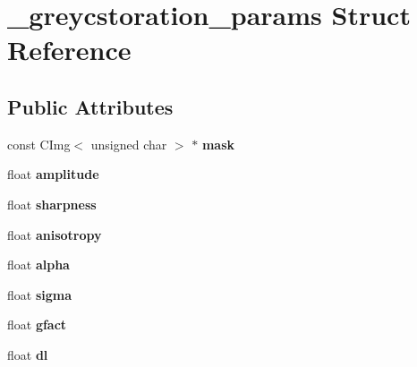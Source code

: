 \hypertarget{struct__greycstoration__params}{\section{\-\_\-greycstoration\-\_\-params Struct Reference}
\label{struct__greycstoration__params}
}
\subsection*{Public Attributes}
\begin{DoxyCompactItemize}
\item 
\hypertarget{struct__greycstoration__params_a877f6302eb82945daf2cf7279a3fe259}{const C\-Img$<$ unsigned char $>$ $\ast$ {\bfseries mask}}\label{struct__greycstoration__params_a877f6302eb82945daf2cf7279a3fe259}

\item 
\hypertarget{struct__greycstoration__params_a55ed63c4963f130a93a5997c6fc15644}{float {\bfseries amplitude}}\label{struct__greycstoration__params_a55ed63c4963f130a93a5997c6fc15644}

\item 
\hypertarget{struct__greycstoration__params_afed015b7f8dc6789164b1887ae3d6e49}{float {\bfseries sharpness}}\label{struct__greycstoration__params_afed015b7f8dc6789164b1887ae3d6e49}

\item 
\hypertarget{struct__greycstoration__params_a4fcc10e360e2e2960139035e014e5b36}{float {\bfseries anisotropy}}\label{struct__greycstoration__params_a4fcc10e360e2e2960139035e014e5b36}

\item 
\hypertarget{struct__greycstoration__params_aa38998065e46e72aef6afc81252ef0d9}{float {\bfseries alpha}}\label{struct__greycstoration__params_aa38998065e46e72aef6afc81252ef0d9}

\item 
\hypertarget{struct__greycstoration__params_acc0e3141df46a19a54a4c9c6cb24fe64}{float {\bfseries sigma}}\label{struct__greycstoration__params_acc0e3141df46a19a54a4c9c6cb24fe64}

\item 
\hypertarget{struct__greycstoration__params_af66010459b28409ba3e6e6ab569bbc5e}{float {\bfseries gfact}}\label{struct__greycstoration__params_af66010459b28409ba3e6e6ab569bbc5e}

\item 
\hypertarget{struct__greycstoration__params_a801f48f4af3840f14e32dfc45c051abc}{float {\bfseries dl}}\label{struct__greycstoration__params_a801f48f4af3840f14e32dfc45c051abc}


\end{DoxyCompactItemize}
